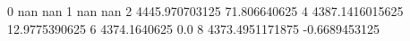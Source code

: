 0 nan nan
1 nan nan
2 4445.970703125 71.806640625
4 4387.1416015625 12.9775390625
6 4374.1640625 0.0
8 4373.4951171875 -0.6689453125
